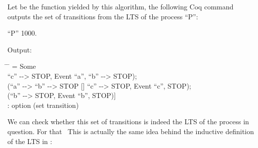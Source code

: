 Let  be the function yielded by this algorithm, the following Coq command outputs the set of transitions from the LTS of the process ``P'':

\begin{coqdoccode}
	\coqdocnoindent
	   ``P'' 1000.\coqdoceol
\end{coqdoccode}

\begin{flushleft}
	Output:
\end{flushleft}

\begin{tabbing}
	\hspace*{2.5em}\= \hspace*{2em} \= \kill
	= Some\\
	\>	[(``a'' -{}-> ``b'' -{}-> STOP [] ``c'' -{}-> STOP, Event ``a'', ``b'' -{}-> STOP);\\
	\>	(``a'' -{}-> ``b'' -{}-> STOP [] ``c'' -{}-> STOP, Event ``c'', STOP);\\
	\>	(``b'' -{}-> STOP, Event ``b'', STOP)]\\
	: option (set transition)
\end{tabbing}

We can check whether this set of transitions is indeed the LTS of the process in question. For that \textellipsis \ This is actually the same idea behind the inductive definition of the LTS in \CSPcoq{}:


